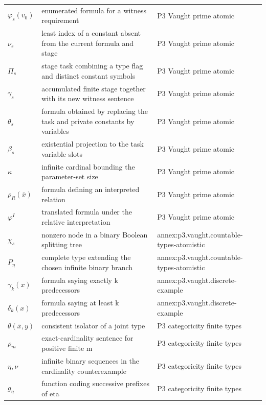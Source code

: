 \begin{longtable}{@{}p{}p{}p{}@{}}
\(\varphi_s(v_0)\) & enumerated formula for a witness requirement & P3 Vaught prime atomic \\
\(\nu_s\) & least index of a constant absent from the current formula and stage & P3 Vaught prime atomic \\
\(\Pi_s\) & stage task combining a type flag and distinct constant symbols & P3 Vaught prime atomic \\
\(\gamma_s\) & accumulated finite stage together with its new witness sentence & P3 Vaught prime atomic \\
\(\theta_s\) & formula obtained by replacing the task and private constants by variables & P3 Vaught prime atomic \\
\(\beta_s\) & existential projection to the task variable slots & P3 Vaught prime atomic \\
\(\kappa\) & infinite cardinal bounding the parameter-set size & P3 Vaught prime atomic \\
\(\rho_R(\bar x)\) & formula defining an interpreted relation & P3 Vaught prime atomic \\
\(\varphi^I\) & translated formula under the relative interpretation & P3 Vaught prime atomic \\
\(\chi_s\) & nonzero node in a binary Boolean splitting tree & annex:\allowbreak{}p3.\allowbreak{}vaught.\allowbreak{}countable-\allowbreak{}types-\allowbreak{}atomistic \\
\(P_\eta\) & complete type extending the chosen infinite binary branch & annex:\allowbreak{}p3.\allowbreak{}vaught.\allowbreak{}countable-\allowbreak{}types-\allowbreak{}atomistic \\
\(\gamma_k(x)\) & formula saying exactly k predecessors & annex:\allowbreak{}p3.\allowbreak{}vaught.\allowbreak{}discrete-\allowbreak{}example \\
\(\delta_k(x)\) & formula saying at least k predecessors & annex:\allowbreak{}p3.\allowbreak{}vaught.\allowbreak{}discrete-\allowbreak{}example \\
\(\theta(\bar x,\allowbreak y)\) & consistent isolator of a joint type & P3 categoricity finite types \\
\(\rho_m\) & exact-cardinality sentence for positive finite m & P3 categoricity finite types \\
\(\eta,\allowbreak \nu\) & infinite binary sequences in the cardinality counterexample & P3 categoricity finite types \\
\(g_\eta\) & function coding successive prefixes of eta & P3 categoricity finite types \\

\end{longtable}
